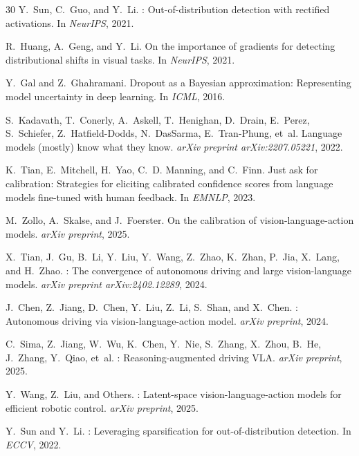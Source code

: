 \documentclass[11pt]{article}
\begin{document}
\begin{thebibliography}{30}
Y.~Sun, C.~Guo, and Y.~Li.
: Out-of-distribution detection with rectified activations.
\newblock In \emph{NeurIPS}, 2021.

R.~Huang, A.~Geng, and Y.~Li.
\newblock On the importance of gradients for detecting distributional shifts in visual tasks.
\newblock In \emph{NeurIPS}, 2021.

Y.~Gal and Z.~Ghahramani.
\newblock Dropout as a {B}ayesian approximation: Representing model uncertainty in deep learning.
\newblock In \emph{ICML}, 2016.

S.~Kadavath, T.~Conerly, A.~Askell, T.~Henighan, D.~Drain, E.~Perez, S.~Schiefer, Z.~Hatfield-Dodds, N.~DasSarma, E.~Tran-Phung, et~al.
\newblock Language models (mostly) know what they know.
\newblock \emph{arXiv preprint arXiv:2207.05221}, 2022.

K.~Tian, E.~Mitchell, H.~Yao, C.~D. Manning, and C.~Finn.
\newblock Just ask for calibration: Strategies for eliciting calibrated confidence scores from language models fine-tuned with human feedback.
\newblock In \emph{EMNLP}, 2023.

M.~Zollo, A.~Skalse, and J.~Foerster.
\newblock On the calibration of vision-language-action models.
\newblock \emph{arXiv preprint}, 2025.

X.~Tian, J.~Gu, B.~Li, Y.~Liu, Y.~Wang, Z.~Zhao, K.~Zhan, P.~Jia, X.~Lang, and H.~Zhao.
: The convergence of autonomous driving and large vision-language models.
\newblock \emph{arXiv preprint arXiv:2402.12289}, 2024.

J.~Chen, Z.~Jiang, D.~Chen, Y.~Liu, Z.~Li, S.~Shan, and X.~Chen.
: Autonomous driving via vision-language-action model.
\newblock \emph{arXiv preprint}, 2024.

C.~Sima, Z.~Jiang, W.~Wu, K.~Chen, Y.~Nie, S.~Zhang, X.~Zhou, B.~He, J.~Zhang, Y.~Qiao, et~al.
: Reasoning-augmented driving VLA.
\newblock \emph{arXiv preprint}, 2025.

Y.~Wang, Z.~Liu, and Others.
: Latent-space vision-language-action models for efficient robotic control.
\newblock \emph{arXiv preprint}, 2025.

Y.~Sun and Y.~Li.
: Leveraging sparsification for out-of-distribution detection.
\newblock In \emph{ECCV}, 2022.


\end{thebibliography}
\end{document}
